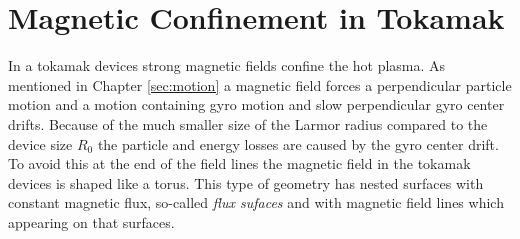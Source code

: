 \newpage
\section{Magnetic Confinement in Tokamak}
\label{sec:confinement}

In a tokamak devices strong magnetic fields confine the hot plasma. As mentioned in Chapter \ref{sec:motion} a magnetic field forces a perpendicular particle motion and a motion containing gyro motion and slow perpendicular gyro center drifts. Because of the much smaller size of the Larmor radius compared to the device size $R_0$ the particle and energy losses are caused by the gyro center drift. To avoid this at the end of the field lines the magnetic field in the tokamak devices is shaped like a torus. This type of geometry has nested surfaces with constant magnetic flux, so-called \textit{flux sufaces} and with magnetic field lines which appearing on that surfaces. 
